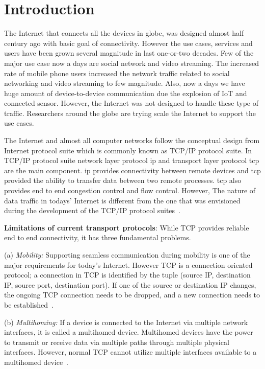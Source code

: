 

\section{Introduction}
The Internet that connects all the devices in globe, was designed almost half century ago with basic goal of connectivity. However the use cases, services and users have been grown several magnitude in last one-or-two decades. Few of the major use case now a days are social network and video streaming. The increased rate of mobile phone users increased the network traffic related to social networking and video streaming to few magnitude. Also, now a days we have huge amount of device-to-device communication due the explosion of IoT and connected sensor. However, the Internet was not designed to handle these type of traffic. Researchers around the globe are trying scale the Internet to support the use cases.

The Internet and almost all computer networks follow the conceptual design from Internet protocol suite which is commonly known as TCP/IP protocol suite. In TCP/IP protocol suite network layer protocol \acrfull{ip} and transport layer protocol \acrfull{tcp} are the main component. \acrshort{ip} provides connectivity between remote devices and \acrshort{tcp} provided the ability to transfer data between two remote processes. \acrshort{tcp} also provides end to end congestion control and flow control. However, The nature of data traffic in todays' Internet is different from the one that was envisioned during the development of the TCP/IP protocol suites~\cite{rexford2010future}.

\textbf{Limitations of current transport protocols}: While TCP provides reliable end to end connectivity,  it has three fundamental problems.  

(a) \textit{Mobility:} Supporting seamless communication during mobility is one of the major requirements for today's Internet. However TCP is a connection oriented protocol; a connection in TCP is identified by the tuple (source IP, destination IP, source port, destination port). If one of the source or destination IP changes, the ongoing TCP connection needs to be dropped, and a new connection needs to be established~\cite{yadav2016msocket}. 

(b) \textit{Multihoming:} If a device is connected to the Internet via multiple network interfaces, it is called a multihomed device. Multihomed devices have the power to transmit or receive data via multiple paths through multiple physical interfaces. However, normal TCP cannot utilize multiple interfaces available to a multihomed device~\cite{de2016observing}. 

